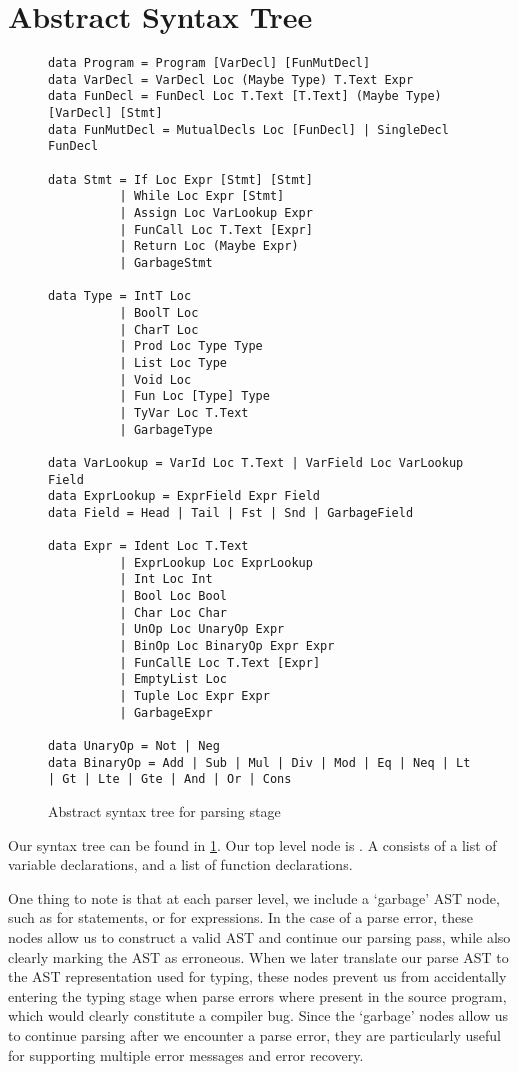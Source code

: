 \section{Abstract Syntax Tree}

\begin{figure}
\begin{verbatim}
data Program = Program [VarDecl] [FunMutDecl]
data VarDecl = VarDecl Loc (Maybe Type) T.Text Expr
data FunDecl = FunDecl Loc T.Text [T.Text] (Maybe Type) [VarDecl] [Stmt]
data FunMutDecl = MutualDecls Loc [FunDecl] | SingleDecl FunDecl

data Stmt = If Loc Expr [Stmt] [Stmt]
          | While Loc Expr [Stmt]
          | Assign Loc VarLookup Expr
          | FunCall Loc T.Text [Expr]
          | Return Loc (Maybe Expr)
          | GarbageStmt

data Type = IntT Loc
          | BoolT Loc
          | CharT Loc
          | Prod Loc Type Type
          | List Loc Type
          | Void Loc
          | Fun Loc [Type] Type
          | TyVar Loc T.Text
          | GarbageType

data VarLookup = VarId Loc T.Text | VarField Loc VarLookup Field
data ExprLookup = ExprField Expr Field
data Field = Head | Tail | Fst | Snd | GarbageField

data Expr = Ident Loc T.Text
          | ExprLookup Loc ExprLookup
          | Int Loc Int
          | Bool Loc Bool
          | Char Loc Char
          | UnOp Loc UnaryOp Expr
          | BinOp Loc BinaryOp Expr Expr
          | FunCallE Loc T.Text [Expr]
          | EmptyList Loc
          | Tuple Loc Expr Expr
          | GarbageExpr

data UnaryOp = Not | Neg
data BinaryOp = Add | Sub | Mul | Div | Mod | Eq | Neq | Lt | Gt | Lte | Gte | And | Or | Cons
\end{verbatim}
	\caption{Abstract syntax tree for parsing stage}
  \label{fig:parse-ast}
\end{figure}

Our syntax tree can be found in \cref{fig:parse-ast}. Our top level node is
. A  consists of a
list of variable declarations, and a list of function declarations.

One thing to note is that at each parser level, we include a `garbage' AST node,
such as  for statements, or  for
expressions. In the case of a parse error, these nodes allow us to construct a
valid AST and continue our parsing pass, while also clearly marking the AST as
erroneous. When we later translate our parse AST to the AST representation used
for typing, these nodes prevent us from accidentally entering the typing stage
when parse errors where present in the source program, which would clearly
constitute a compiler bug.
Since the `garbage' nodes allow us to continue parsing after we encounter a
parse error, they are particularly useful for supporting multiple error messages
and error recovery.

